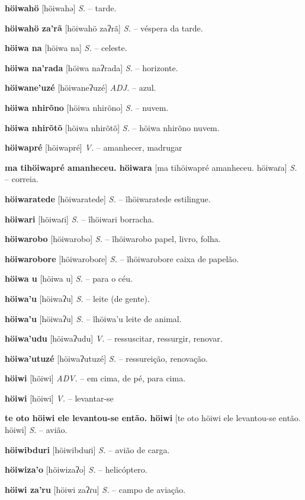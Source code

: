 \textbf{höiwahö} [höiwahə] \textit{S.} -- tarde.

\textbf{höiwahö za'rã} [höiwahö zaʔrã] \textit{S.} -- véspera da tarde.

\textbf{höiwa na} [höiwa na] \textit{S.} -- celeste.

\textbf{höiwa na'rada} [höiwa naʔrada] \textit{S.} -- horizonte.

\textbf{höiwane'uzé} [höiwaneʔuzé] \textit{ADJ.} -- azul.

\textbf{höiwa nhirõno} [höiwa nhirõno] \textit{S.} -- nuvem.

\textbf{höiwa nhirõtõ} [höiwa nhirõtõ] \textit{S.} -- höiwa nhirõno nuvem.

\textbf{höiwapré} [höiwapré] \textit{V.} -- amanhecer, madrugar

\textbf{ma tihöiwapré amanheceu. höiwara} [ma tihöiwapré amanheceu. höiwaɾa] \textit{S.} -- correia.

\textbf{höiwaratede} [höiwaratede] \textit{S.} -- ĩhöiwaratede estilingue.

\textbf{höiwari} [höiwaɾi] \textit{S.} -- ĩhöiwari borracha.

\textbf{höiwarobo} [höiwarobo] \textit{S.} -- ĩhöiwarobo papel, livro, folha.

\textbf{höiwarobore} [höiwaroboɾe] \textit{S.} -- ĩhöiwarobore caixa de papelão.

\textbf{höiwa u} [höiwa u] \textit{S.} -- para o céu.

\textbf{höiwa'u} [höiwaʔu] \textit{S.} -- leite (de gente).

\textbf{höiwa'u} [höiwaʔu] \textit{S.} -- ĩhöiwa'u leite de animal.

\textbf{höiwa'udu} [höiwaʔudu] \textit{V.} -- ressuscitar, ressurgir, renovar.

\textbf{höiwa'utuzé} [höiwaʔutuzé] \textit{S.} -- ressureição, renovação.

\textbf{höiwi} [höiwi] \textit{ADV.} -- em cima, de pé, para cima.

\textbf{höiwi} [höiwi] \textit{V.} -- levantar-se

\textbf{te oto höiwi ele levantou-se então. höiwi} [te oto höiwi ele levantou-se então. höiwi] \textit{S.} -- avião.

\textbf{höiwibduri} [höiwibduɾi] \textit{S.} -- avião de carga.

\textbf{höiwiza'o} [höiwizaʔo] \textit{S.} -- helicóptero.

\textbf{höiwi za'ru} [höiwi zaʔɾu] \textit{S.} -- campo de aviação.

